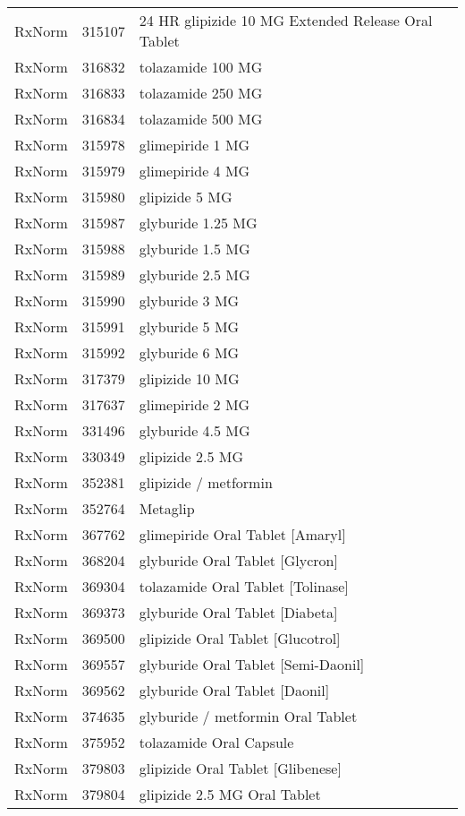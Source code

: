 \begin{longtable}{p{}p{}p{}}
  RxNorm & 315107 & 24 HR glipizide 10 MG Extended Release Oral Tablet \\ 
  RxNorm & 316832 & tolazamide 100 MG \\ 
  RxNorm & 316833 & tolazamide 250 MG \\ 
  RxNorm & 316834 & tolazamide 500 MG \\ 
  RxNorm & 315978 & glimepiride 1 MG \\ 
  RxNorm & 315979 & glimepiride 4 MG \\ 
  RxNorm & 315980 & glipizide 5 MG \\ 
  RxNorm & 315987 & glyburide 1.25 MG \\ 
  RxNorm & 315988 & glyburide 1.5 MG \\ 
  RxNorm & 315989 & glyburide 2.5 MG \\ 
  RxNorm & 315990 & glyburide 3 MG \\ 
  RxNorm & 315991 & glyburide 5 MG \\ 
  RxNorm & 315992 & glyburide 6 MG \\ 
  RxNorm & 317379 & glipizide 10 MG \\ 
  RxNorm & 317637 & glimepiride 2 MG \\ 
  RxNorm & 331496 & glyburide 4.5 MG \\ 
  RxNorm & 330349 & glipizide 2.5 MG \\ 
  RxNorm & 352381 & glipizide / metformin \\ 
  RxNorm & 352764 & Metaglip \\ 
  RxNorm & 367762 & glimepiride Oral Tablet [Amaryl] \\ 
  RxNorm & 368204 & glyburide Oral Tablet [Glycron] \\ 
  RxNorm & 369304 & tolazamide Oral Tablet [Tolinase] \\ 
  RxNorm & 369373 & glyburide Oral Tablet [Diabeta] \\ 
  RxNorm & 369500 & glipizide Oral Tablet [Glucotrol] \\ 
  RxNorm & 369557 & glyburide Oral Tablet [Semi-Daonil] \\ 
  RxNorm & 369562 & glyburide Oral Tablet [Daonil] \\ 
  RxNorm & 374635 & glyburide / metformin Oral Tablet \\ 
  RxNorm & 375952 & tolazamide Oral Capsule \\ 
  RxNorm & 379803 & glipizide Oral Tablet [Glibenese] \\ 
  RxNorm & 379804 & glipizide 2.5 MG Oral Tablet \\ 

\end{longtable}
